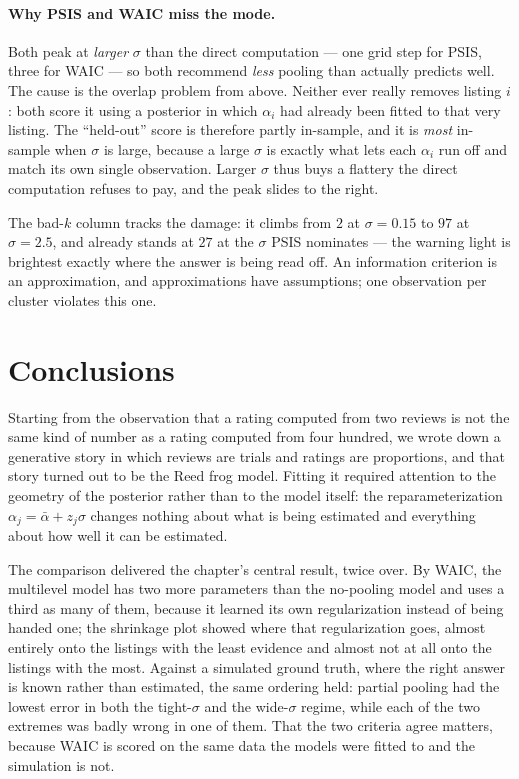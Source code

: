 \documentclass[11pt,a4paper]{article}
\begin{document}
\paragraph{Why PSIS and WAIC miss the mode.} Both peak at \emph{larger} $\sigma$
than the direct computation --- one grid step for PSIS, three for WAIC --- so
both recommend \emph{less} pooling than actually predicts well. The cause is the
overlap problem from above. Neither ever really removes listing $i$: both score
it using a posterior in which $\alpha_i$ had already been fitted to that very
listing. The ``held-out'' score is therefore partly in-sample, and it is
\emph{most} in-sample when $\sigma$ is large, because a large $\sigma$ is exactly
what lets each $\alpha_i$ run off and match its own single observation. Larger
$\sigma$ thus buys a flattery the direct computation refuses to pay, and the
peak slides to the right.

The bad-$k$ column tracks the damage: it climbs from $2$ at $\sigma = 0.15$ to
$97$ at $\sigma = 2.5$, and already stands at $27$ at the $\sigma$ PSIS
nominates --- the warning light is brightest exactly where the answer is being
read off. An information criterion is an approximation, and approximations have
assumptions; one observation per cluster violates this one.

\section{Conclusions}

Starting from the observation that a rating computed from two reviews is not the
same kind of number as a rating computed from four hundred, we wrote down a
generative story in which reviews are trials and ratings are proportions, and
that story turned out to be the Reed frog model. Fitting it required attention
to the geometry of the posterior rather than to the model itself: the
reparameterization $\alpha_j = \bar\alpha + z_j \sigma$ changes nothing about
what is being estimated and everything about how well it can be estimated.

The comparison delivered the chapter's central result, twice over. By WAIC, the
multilevel model has two more parameters than the no-pooling model and uses a
third as many of them, because it learned its own regularization instead of
being handed one; the shrinkage plot showed where that regularization goes,
almost entirely onto the listings with the least evidence and almost not at all
onto the listings with the most. Against a simulated ground truth, where the
right answer is known rather than estimated, the same ordering held: partial
pooling had the lowest error in both the tight-$\sigma$ and the wide-$\sigma$
regime, while each of the two extremes was badly wrong in one of them. That the
two criteria agree matters, because WAIC is scored on the same data the models
were fitted to and the simulation is not.
\end{document}
